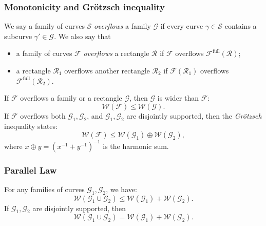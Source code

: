 \documentclass{amsart}
\newcommand{\1}{{\mathbb 1 }}
\newcommand{\FamG}{{\mathcal G}}
\newcommand{\Fam}{{\mathcal F}}
\newcommand{\Width}{{\mathcal W}}
\newcommand\RR{\mathcal{R}}
\renewcommand\SS{\mathcal{S}}
\newcommand\full{{\operatorname{full}}}
\newcommand{\wC}{\widehat{\mathbb{C}}}
\theoremstyle{remark}
\numberwithin{equation}{section}
\theoremstyle{definition}
\begin{document}


\subsubsection{Monotonicity and Gr\"otzsch inequality} \label{sss:Monot+Gr}We say a family of curves $\SS$ \emph{overflows} a family $\FamG$ if every curve $\gamma\in\SS$ contains a subcurve $\gamma'\in \FamG$. We also say that 
\begin{itemize}
\item a family of curves $\Fam$ \emph{overflows} a rectangle $\RR$ if $\Fam$ overflows $\Fam^\full(\RR)$;
\item a rectangle $\RR_1$ overflows another rectangle $\RR_2$ if $\Fam(\RR_1)$ overflows $\Fam^\full(\RR_2)$.
\end{itemize}
 
 

If $\Fam$ overflows a family or a rectangle $\FamG$, then $\FamG$ is wider than $\Fam$:
\begin{equation}
\label{eq:Width Monot}
\Width(\Fam) \le \Width(\FamG).
\end{equation}
If $\Fam$ overflows both $\FamG_1,\FamG_2$, and $\FamG_1,\FamG_2$ are disjointly supported, then the \emph{Gr\"otzsch} inequality states:
\begin{equation}
\label{eq:Grot}
\Width(\Fam) \le \Width(\FamG_1)\oplus \Width(\FamG_2),
\end{equation}
where $x\oplus y =(x^{-1}+y^{-1})^{-1}$ is the harmonic sum. 




\subsubsection{Parallel Law}\label{sss:ParLaw}
 For any families of curves $\FamG_1,\FamG_2$, we have:
\begin{equation}
\label{eq:ParLaw}
\Width(\FamG_1\cup \FamG_2)\le \Width(\FamG_1)+\Width(\FamG_2).
\end{equation}
If $\FamG_1,\FamG_2$ are disjointly supported, then
\begin{equation}
\label{eq:StrictParLaw}
\Width(\FamG_1\cup \FamG_2) = \Width(\FamG_1)+\Width(\FamG_2).
\end{equation}
\end{document}
